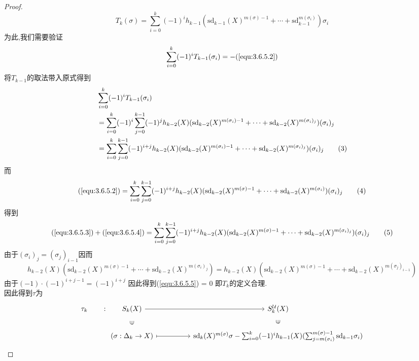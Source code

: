 \documentclass{article}
\begin{document}
\begin{proof}
    $$
    T_k(\sigma) = \sum_{i = 0}^k (-1)^i h_{k-1}(\text{sd}_{k-1}(X)^{m(\sigma)-1}+\cdots+\text{sd}_{k-1}^{m(\sigma_i)})\sigma_i
    $$
    为此,我们需要验证
    $$
    \sum_{i = 0}^k (-1)^i T_{k-1}(\sigma_i)  = -(\ref{equ:3.6.5.2})
    $$
    将$T_{k-1}$的取法带入原式得到
    \begin{align}
        &\sum_{i = 0}^k(-1)^i T_{k-1}(\sigma_i)\notag \\
        &= \sum_{i = 0}^k (-1)^i\sum_{j = 0}^{k-1}(-1)^j h_{k-2}(X)(\text{sd}_{k-2}(X)^{m(\sigma_i)-1}+\cdots +\text{sd}_{k-2}(X)^{m(\sigma_i)_j})(\sigma_i)_j\notag\\
        &=\sum_{i = 0}^k\sum_{j = 0}^{k-1}(-1)^{i+j}h_{k-2}(X)(\text{sd}_{k-2}(X)^{m(\sigma_i)-1}+\cdots +\text{sd}_{k-2}(X)^{m(\sigma_i)_j})(\sigma_i)_j
        \tag{3}\label{equ:3.6.5.3}
    \end{align}
    而
    \begin{equation}
        (\ref{equ:3.6.5.2}) = \sum_{i = 0}^k\sum_{j = 0}^{k-1}(-1)^{i+j}h_{k-2}(X)(\text{sd}_{k-2}(X)^{m(\sigma)-1}+\cdots +\text{sd}_{k-2}(X)^{m(\sigma_i)})(\sigma_i)_j
        \tag{4}
        \label{equ:3.6.5.4}
    \end{equation}
    得到
    \begin{equation}
        (\ref{equ:3.6.5.3})+(\ref{equ:3.6.5.4}) = \sum_{i = 0}^k\sum_{j = 0}^{k-1}(-1)^{i+j}h_{k-2}(X)(\text{sd}_{k-2}(X)^{m(\sigma)-1}+\cdots +\text{sd}_{k-2}(X)^{m(\sigma_i)_j})(\sigma_i)_j
        \tag{5}
        \label{equ:3.6.5.5}
    \end{equation}
    由于$(\sigma_i)_j = (\sigma_{j})_{i-1}$因而
    $$
    h_{k-2}(X)(\text{sd}_{k-2}(X)^{m(\sigma)-1}+\cdots+\text{sd}_{k-2}(X)^{m(\sigma_i)_j}) =  h_{k-2}(X)(\text{sd}_{k-2}(X)^{m(\sigma)-1}+\cdots+\text{sd}_{k-2}(X)^{m(\sigma_j)_{i-1}})
    $$
    由于$(-1)\cdot(-1)^{i+j - 1} = (-1)^{i+j}$
    因此得到(\ref{equ:3.6.5.5}) = 0
    即$T_k$的定义合理.\\
    因此得到$\tau$为
    \[\begin{tikzcd}
        {\tau_k} & {S_k(X)} && {S_k^\mathcal{U}(X)} \\
        & {(\sigma:\Delta_k \to X)} && {\text{sd}_{k}(X)^{m(\sigma)}\sigma - \sum_{i = 0}^k (-1)^i h_{k-1}(X)(\sum_{j = m(\sigma_i)}^{m(\sigma)-1}\text{sd}_{k-1}\sigma_i)}
        \arrow["{:}"{marking}, draw=none, from=1-1, to=1-2]
        \arrow[from=1-2, to=1-4]
        \arrow["\in"{marking}, draw=none, from=2-2, to=1-2]
        \arrow["\in"{marking}, draw=none, from=2-4, to=1-4]
        \arrow[maps to, from=2-2, to=2-4]
    \end{tikzcd}\]

\end{proof}
\end{document}
